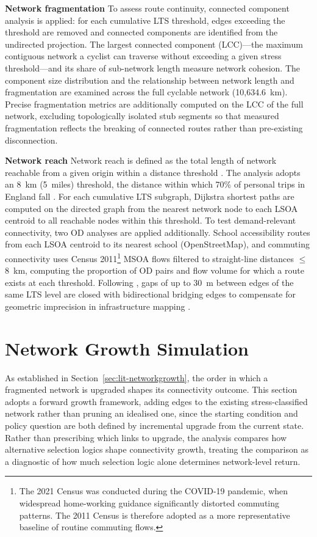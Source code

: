 \textbf{Network fragmentation} To assess route continuity, connected component analysis is applied: for each cumulative LTS threshold, edges exceeding the threshold are removed and connected components are identified from the undirected projection. The largest connected component (LCC)---the maximum contiguous network a cyclist can traverse without exceeding a given stress threshold---and its share of sub-network length measure network cohesion. The component size distribution and the relationship between network length and fragmentation are examined across the full cyclable network (10,634.6~km). Precise fragmentation metrics are additionally computed on the LCC of the full network, excluding topologically isolated stub segments so that measured fragmentation reflects the breaking of connected routes rather than pre-existing disconnection.

\textbf{Network reach} Network reach is defined as the total length of network reachable from a given origin within a distance threshold \parencite{peponis2008,feng2019,viero2025}. The analysis adopts an 8~km (5~miles) threshold, the distance within which 70\% of personal trips in England fall \parencite{departmentfortransport2020a,departmentfortransport2025}. For each cumulative LTS subgraph, Dijkstra shortest paths are computed on the directed graph from the nearest network node to each LSOA centroid to all reachable nodes within this threshold. To test demand-relevant connectivity, two OD analyses are applied additionally. School accessibility routes from each LSOA centroid to its nearest school (OpenStreetMap), and commuting connectivity uses Census 2011\footnote{The 2021 Census was conducted during the COVID-19 pandemic, when widespread home-working guidance significantly distorted commuting patterns. The 2011 Census is therefore adopted as a more representative baseline of routine commuting flows.} MSOA flows filtered to straight-line distances $\leq$ 8~km, computing the proportion of OD pairs and flow volume for which a route exists at each threshold. Following \textcite{viero2025}, gaps of up to 30~m between edges of the same LTS level are closed with bidirectional bridging edges to compensate for geometric imprecision in infrastructure mapping \parencite{schoner2014}.

\section{Network Growth Simulation}
\label{sec:method-growth}

As established in Section~\ref{sec:lit-networkgrowth}, the order in which a fragmented network is upgraded shapes its connectivity outcome. This section adopts a forward growth framework, adding edges to the existing stress-classified network rather than pruning an idealised one, since the starting condition and policy question are both defined by incremental upgrade from the current state. Rather than prescribing which links to upgrade, the analysis compares how alternative selection logics shape connectivity growth, treating the comparison as a diagnostic of how much selection logic alone determines network-level return.

